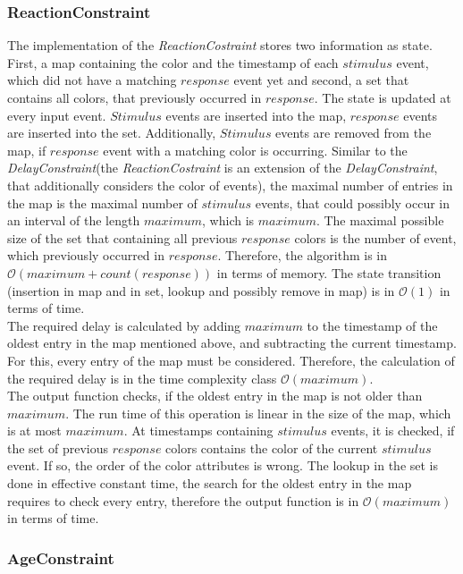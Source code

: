 \subsubsection{ReactionConstraint}
	The implementation of the \emph{ReactionCostraint} stores two information as state. First, a map containing the color and the timestamp of each $stimulus$ event, which did not have a matching $response$ event yet and second, a set that contains all colors, that previously occurred in $response$. The state is updated at every input event. $Stimulus$ events are inserted into the map, $response$ events are inserted into the set. Additionally, $Stimulus$ events are removed from the map, if $response$ event with a matching color is occurring. Similar to the \emph{DelayConstraint}(the \emph{ReactionCostraint} is an extension of the \emph{DelayConstraint}, that additionally considers the color of events), the maximal number of entries in the map is the maximal number of $stimulus$ events, that could possibly occur in an interval of the length $maximum$, which is $maximum$. The maximal possible size of the set that containing all previous $response$ colors is the number of event, which previously occurred in $response$. Therefore, the algorithm is in $\mathcal{O}(maximum+count(response))$ in terms of memory. The state transition (insertion in map and in set, lookup and possibly remove in map) is in $\mathcal{O}(1)$ in terms of time.\\
	The required delay is calculated by adding $maximum$ to the timestamp of the oldest entry in the map mentioned above, and subtracting the current timestamp. For this, every entry of the map must be considered. Therefore, the calculation of the required delay is in the time complexity class $\mathcal{O}(maximum)$.\\
	The output function checks, if the oldest entry in the map is not older than $maximum$. The run time of this operation is linear in the size of the map, which is at most $maximum$. At timestamps containing $stimulus$ events, it is checked, if the set of previous $response$ colors contains the color of the current $stimulus$ event.  If so, the order of the color attributes is wrong. The lookup in the set is done in effective constant time, the search for the oldest entry in the map requires to check every entry, therefore the output function is in $\mathcal{O}(maximum)$ in terms of time.
	
\subsubsection{AgeConstraint}

